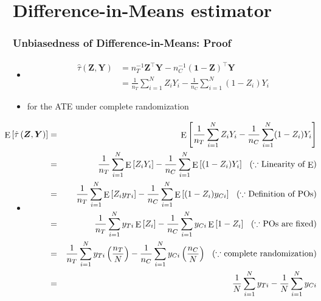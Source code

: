 \documentclass[table, xcolor = {dvipsnames}, 9pt]{beamer}
\theoremstyle{plain}
\newcommand{\mh}[1]{{\color{magenta}{#1}}}
\DeclareMathOperator{\E}{\rm{E}}
\begin{document}
\section{Difference-in-Means estimator}
\begin{frame}
  \frametitle{Unbiasedness of Difference-in-Means: Proof}
  \small
  \begin{itemize}
  \item \mh{Difference-in-Means estimator}
    \begin{align*}
      \hat{\tau}\left(\bm{Z}, \bm{Y}\right) & = n_T^{-1} \bm{Z}^{\top} \bm{Y} - n_C^{-1} \left(\bm{1} - \bm{Z}\right)^{\top}\bm{Y} \\ 
      & = \frac{1}{n_T} \sum_{i=1}^N Z_i Y_i - \frac{1}{n_C} \sum_{i = 1}^N (1 - Z_i) Y_i
    \end{align*} \pause
  \item \mh{Unbiased} for the ATE under complete randomization \pause
  \item[] 
    {\footnotesize
      \begin{eqnarray*}
        \hspace{-0.4in} \E\left[\hat{\tau}\left(\bm{Z}, \bm{Y}\right)\right] & = & \E\left[\frac{1}{n_T} \sum_{i=1}^N Z_i Y_i - \frac{1}{n_C} \sum_{i = 1}^N (1 - Z_i) Y_i\right]\\
        \hspace{-0.4in} & = &  \frac{1}{n_T} \sum_{i=1}^N \E\left[Z_i Y_i\right]
                              - \frac{1}{n_C} \sum_{i=1}^N \E\left[(1 - Z_i) Y_i\right] \hspace{0.1in}
                              \mbox{($\because$ Linearity of $\E$)}\\ 
        \hspace{-0.4in} & = &  \frac{1}{n_T} \sum_{i=1}^N \E\left[Z_i y_{Ti}\right]
                              - \frac{1}{n_C} \sum_{i=1}^N \E\left[(1 - Z_i) y_{Ci} \right] \hspace{0.1in}
                              \mbox{($\because$ Definition of POs)}\\ 
        \hspace{-0.4in} & = &  \frac{1}{n_T} \sum_{i=1}^N y_{Ti} \E\left[Z_i\right]
                              - \frac{1}{n_C} \sum_{i=1}^N y_{Ci} \E\left[1 - Z_i\right] \hspace{0.1in}
                              \mbox{($\because$ POs are fixed)}\\ 
         \hspace{-0.4in} & = &  \frac{1}{n_T} \sum_{i=1}^N y_{Ti} \left(\frac{n_T}{N}\right)
                              - \frac{1}{n_C} \sum_{i=1}^N y_{Ci} \left(\frac{n_C}{N}\right) \hspace{0.1in}
                              \mbox{($\because$ complete randomization)}\\ 
          \hspace{-0.4in} & = &  \frac{1}{N} \sum_{i=1}^N y_{Ti}
                              - \frac{1}{N} \sum_{i=1}^N y_{Ci}
      \end{eqnarray*}}
  \end{itemize}
\end{frame}
\end{document}
